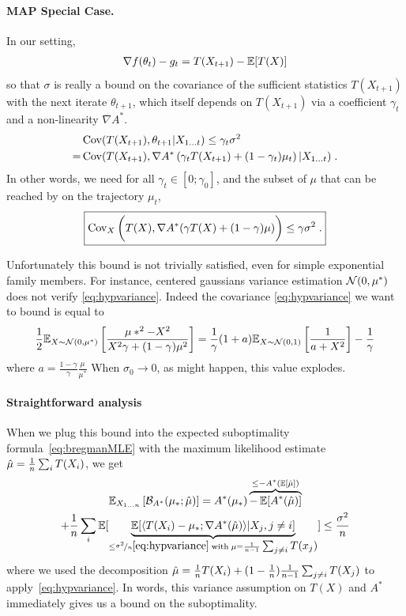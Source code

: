\documentclass{article}
\newcommand*{\expect}[2][]{\ensuremath{\mathbb{E}_{#1} \left[ #2 \right] }} %
\newcommand{\logpart}{A}
\newcommand{\conj}{\logpart^*}
\newcommand{\bregmanconj}{\cB_{\logpart^*}}
\newcommand{\natp}{\theta}
\newcommand{\lr}{\gamma} %
\begin{document}
\paragraph{MAP Special Case.}
In our setting, 
\begin{align}
	\nabla f(\natp_t) - g_t =  T(X_{t+1})	- \E[T(X)]
\end{align}
so that $\sigma$ is really a bound on the covariance of the sufficient statistics $T(X_{t+1})$ with the next iterate $\natp_{t+1}$, which itself depends on $T(X_{t+1})$ via a coefficient $\lr_t$ and a non-linearity $\nabla\conj$.
\begin{align}
	&\Cov( T(X_{t+1}), \natp_{t+1} | X_{1\dots t})
	\leq \lr_t\sigma^2 
	\label{eq:covariance_assumption} \\
	=& \Cov(T(X_{t+1}), \nabla\conj \left(\lr_t T(X_{t+1}) + (1-\lr_t ) \mu_t \right) | X_{1\dots t}) \;.
\end{align}
In other words, we need for all $\lr_t \in [0; \lr_0]$, and the subset of $\mu$ that can be reached by on the trajectory $\mu_t$,
\begin{align}
\label{eq:hypvariance}
	\boxed{
	\Cov_X \bigg(T(X), \nabla \conj (\lr T(X) + (1-\lr) \mu)\bigg	) 
	\leq \lr \sigma^2 \; .
	}
\end{align}

\begin{example}
Unfortunately this bound is not trivially satisfied, even for simple exponential family members.
For instance, centered gaussians variance estimation ${\mathcal N}(0,\mu^*)$ does not verify \eqref{eq:hypvariance}.
Indeed the covariance  \eqref{eq:hypvariance} we want to bound is equal to
\begin{align}
	\half \expect[X\sim \cN(0,\mu^*)]{\frac{\mu*^2 - X^2 }{ X^2 \lr + (1-\lr) \mu^2 }}
	= \inv{\lr} (1+a) \expect[X \sim \cN(0,1)]{\inv{a + X^2}} - \inv{\lr} 
\end{align}
where $a = \frac{1-\lr}{\lr} \frac{\mu}{\mu^*}$
When $\sigma_0 \rightarrow 0$, as might happen, this value explodes.
\end{example}

\paragraph{Straightforward analysis}
When we plug this bound into the expected suboptimality formula~\eqref{eq:bregmanMLE} with the maximum likelihood estimate $\hat \mu =  \frac{1}{n}\sum_i T(X_i)$, we get
\begin{multline}
	\expect[X_{1\dots n}]{\bregmanconj ( \mu_* ;\hat \mu) }
	=\conj(\mu_*) \overbrace{- \E[\conj(\hat \mu)]}^{\leq - \conj(\E[\hat \mu])} \\
	+ \inv{n}\sum_i \E[\underbrace{\E[\langle  T(X_i) - \mu_*; \nabla\conj (\hat \mu) \rangle | X_j, j\neq i]}_{\leq \nicefrac{\sigma^2}{n} \eqref{eq:hypvariance}
	 	\; \text{with}\; \mu=\inv{n-1}\smallsum_{j\neq i} T(x_j)  } ]  \leq \frac{\sigma^2}{n}
\label{eq:MLE_bound}
\end{multline}
where we used the decomposition $\hat \mu = \frac{1}{n}T(X_i) + (1-\frac{1}{n}) \frac{1}{n-1} \sum_{j\neq i}T(X_j)$ to apply~\eqref{eq:hypvariance}. 
In words, this variance assumption on $T(X)$ and $\conj$ immediately gives us a bound on the suboptimality. 
\end{document}
